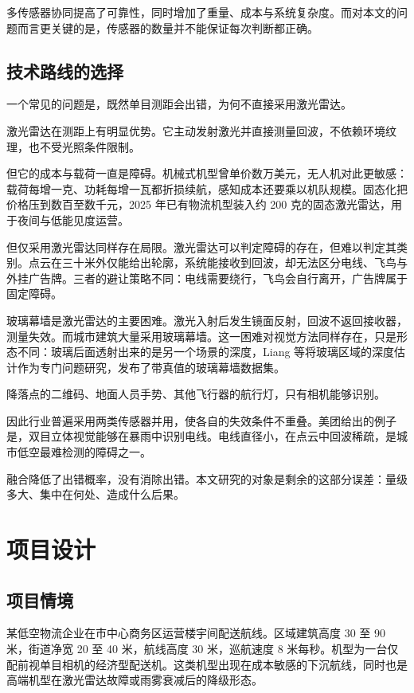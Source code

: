 \documentclass[12pt,a4paper]{ctexart}
\begin{document}
多传感器协同提高了可靠性，同时增加了重量、成本与系统复杂度。而对本文的问题而言更关键的是，传感器的数量并不能保证每次判断都正确。

\subsection{技术路线的选择}

一个常见的问题是，既然单目测距会出错，为何不直接采用激光雷达。

激光雷达在测距上有明显优势。它主动发射激光并直接测量回波，不依赖环境纹理，也不受光照条件限制。

但它的成本与载荷一直是障碍。机械式机型曾单价数万美元，无人机对此更敏感：载荷每增一克、功耗每增一瓦都折损续航，感知成本还要乘以机队规模。固态化把价格压到数百至数千元，2025 年已有物流机型装入约 200 克的固态激光雷达，用于夜间与低能见度运营。

但仅采用激光雷达同样存在局限。激光雷达可以判定障碍的存在，但难以判定其类别。点云在三十米外仅能给出轮廓，系统能接收到回波，却无法区分电线、飞鸟与外挂广告牌。三者的避让策略不同：电线需要绕行，飞鸟会自行离开，广告牌属于固定障碍。

玻璃幕墙是激光雷达的主要困难。激光入射后发生镜面反射，回波不返回接收器，测量失效。而城市建筑大量采用玻璃幕墙。这一困难对视觉方法同样存在，只是形态不同：玻璃后面透射出来的是另一个场景的深度，Liang 等将玻璃区域的深度估计作为专门问题研究，发布了带真值的玻璃幕墙数据集\cite{glasswall}。

降落点的二维码、地面人员手势、其他飞行器的航行灯，只有相机能够识别。

因此行业普遍采用两类传感器并用，使各自的失效条件不重叠。美团给出的例子是，双目立体视觉能够在暴雨中识别电线。电线直径小，在点云中回波稀疏，是城市低空最难检测的障碍之一。

融合降低了出错概率，没有消除出错。本文研究的对象是剩余的这部分误差：量级多大、集中在何处、造成什么后果。

\section{项目设计}

\subsection{项目情境}

某低空物流企业在市中心商务区运营楼宇间配送航线。区域建筑高度 30 至 90 米，街道净宽 20 至 40 米，航线高度 30 米，巡航速度 8 米每秒。机型为一台仅配前视单目相机的经济型配送机。这类机型出现在成本敏感的下沉航线，同时也是高端机型在激光雷达故障或雨雾衰减后的降级形态。
\end{document}
